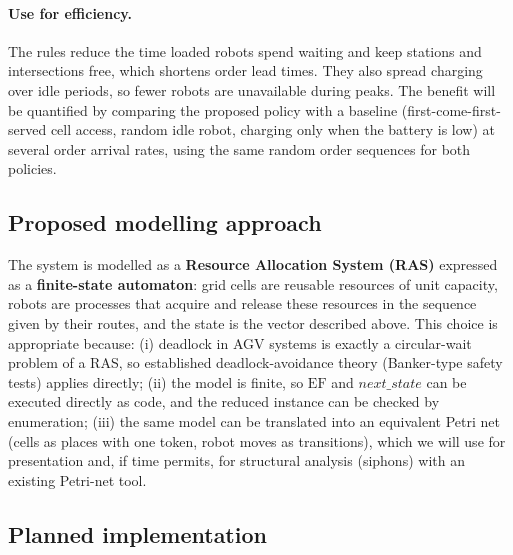 \documentclass[11pt,a4paper]{article}
\newcommand{\EF}{\mathrm{EF}}
\begin{document}
\paragraph{Use for efficiency.} The rules reduce the time loaded robots spend
waiting and keep stations and intersections free, which shortens order lead
times. They also spread charging over idle periods, so fewer robots are
unavailable during peaks. The benefit will be quantified by comparing the
proposed policy with a baseline (first-come-first-served cell access, random
idle robot, charging only when the battery is low) at several order arrival
rates, using the same random order sequences for both policies.

\subsection{Proposed modelling approach}

The system is modelled as a \textbf{Resource Allocation System (RAS)}
expressed as a \textbf{finite-state automaton}: grid cells are reusable
resources of unit capacity, robots are processes that acquire and release
these resources in the sequence given by their routes, and the state
is the vector described above. This choice is appropriate because:
(i) deadlock in AGV systems is exactly a circular-wait problem of a RAS, so
established deadlock-avoidance theory (Banker-type safety tests) applies
directly; (ii) the model is finite, so $\EF$ and $\mathit{next\_state}$
can be executed directly as code, and the reduced instance can be checked by
enumeration; (iii) the same model can be translated into an equivalent Petri
net (cells as places with one token, robot moves as transitions), which we
will use for presentation and, if time permits, for structural analysis
(siphons) with an existing Petri-net tool.

\subsection{Planned implementation}
\end{document}
